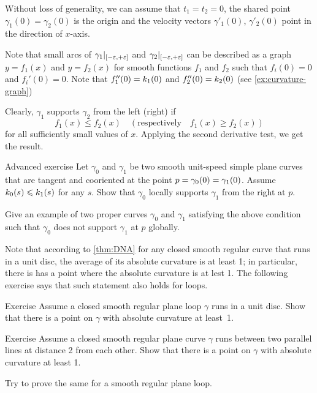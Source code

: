  Without loss of generality, we can assume that $t_1=t_2=0$, the shared point $\gamma_1(0)=\gamma_2(0)$ is the origin and the velocity vectors $\gamma'_1(0)$, $\gamma'_2(0)$ point in the direction of $x$-axis.

Note that small arcs of $\gamma_1|_{[-\varepsilon,+\varepsilon]}$ and  $\gamma_2|_{[-\varepsilon,+\varepsilon]}$ can be described as a graph 
$y=f_1(x)$ and $y=f_2(x)$ for smooth functions $f_1$ and $f_2$ such that $f_i(0)=0$ and $f_i'(0)=0$.
Note that $f_1''(0)=k_1(0)$ and $f_2''(0)=k_2(0)$ (see \ref{ex:curvature-graph})

Clearly, $\gamma_1$ supports $\gamma_2$ from the left (right) if 
\[f_1(x)\le f_2(x)\quad(\text{respectively}\quad f_1(x)\ge f_2(x))\]
for all sufficiently small values of $x$.
Applying the second derivative test, we get the result.
\qeds


\begin{thm}{Advanced exercise}\label{ex:support}
Let $\gamma_0$ and $\gamma_1$ be two smooth unit-speed simple plane curves that are tangent and cooriented at the point $p\z=\gamma_0(0)\z=\gamma_1(0)$.
Assume $k_0(s)\leqslant k_1(s)$ for any $s$.
Show that $\gamma_0$ locally supports $\gamma_1$ from the right at $p$.

Give an example of two proper curves $\gamma_0$ and $\gamma_1$ satisfying the above condition such that $\gamma_0$ does not support $\gamma_1$ at $p$ globally.
\end{thm}

Note that according to \ref{thm:DNA} for any closed smooth regular curve that runs in a unit disc, the average of its absolute curvature is at least 1; in particular, there is has a point where the absolute curvature is at lest 1.
The following exercise says that such  statement also holds for loops.

\begin{thm}{Exercise}\label{ex:in-circle}
Assume a closed smooth regular plane loop $\gamma$ runs in a unit disc.
Show that there is a point on $\gamma$ with absolute curvature at least~1.
\end{thm}


\begin{thm}{Exercise}\label{ex:between-parallels-1}
Assume a closed smooth regular plane curve $\gamma$ runs between two parallel lines at distance 2 from each other.
Show that there is a point on $\gamma$ with absolute curvature at least 1.

Try to prove the same for a smooth regular plane loop.
\end{thm}

